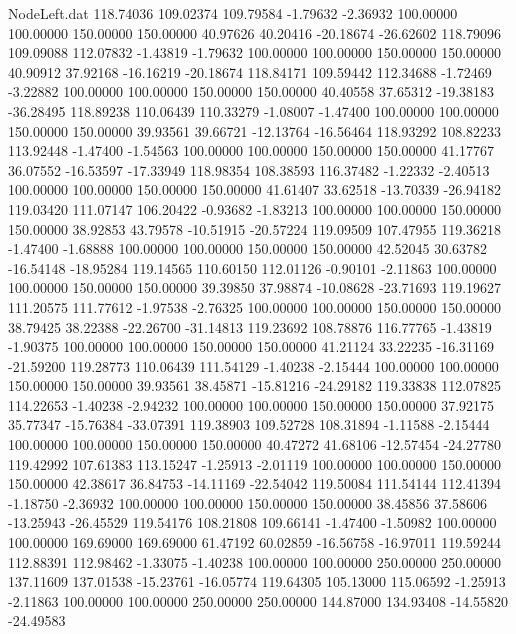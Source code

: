 \begin{filecontents}{NodeLeft.dat}
 118.74036  109.02374  109.79584    -1.79632   -2.36932  100.00000  100.00000  150.00000  150.00000   40.97626   40.20416  -20.18674  -26.62602
 118.79096  109.09088  112.07832    -1.43819   -1.79632  100.00000  100.00000  150.00000  150.00000   40.90912   37.92168  -16.16219  -20.18674
 118.84171  109.59442  112.34688    -1.72469   -3.22882  100.00000  100.00000  150.00000  150.00000   40.40558   37.65312  -19.38183  -36.28495
 118.89238  110.06439  110.33279    -1.08007   -1.47400  100.00000  100.00000  150.00000  150.00000   39.93561   39.66721  -12.13764  -16.56464
 118.93292  108.82233  113.92448    -1.47400   -1.54563  100.00000  100.00000  150.00000  150.00000   41.17767   36.07552  -16.53597  -17.33949
 118.98354  108.38593  116.37482    -1.22332   -2.40513  100.00000  100.00000  150.00000  150.00000   41.61407   33.62518  -13.70339  -26.94182
 119.03420  111.07147  106.20422    -0.93682   -1.83213  100.00000  100.00000  150.00000  150.00000   38.92853   43.79578  -10.51915  -20.57224
 119.09509  107.47955  119.36218    -1.47400   -1.68888  100.00000  100.00000  150.00000  150.00000   42.52045   30.63782  -16.54148  -18.95284
 119.14565  110.60150  112.01126    -0.90101   -2.11863  100.00000  100.00000  150.00000  150.00000   39.39850   37.98874  -10.08628  -23.71693
 119.19627  111.20575  111.77612    -1.97538   -2.76325  100.00000  100.00000  150.00000  150.00000   38.79425   38.22388  -22.26700  -31.14813
 119.23692  108.78876  116.77765    -1.43819   -1.90375  100.00000  100.00000  150.00000  150.00000   41.21124   33.22235  -16.31169  -21.59200
 119.28773  110.06439  111.54129    -1.40238   -2.15444  100.00000  100.00000  150.00000  150.00000   39.93561   38.45871  -15.81216  -24.29182
 119.33838  112.07825  114.22653    -1.40238   -2.94232  100.00000  100.00000  150.00000  150.00000   37.92175   35.77347  -15.76384  -33.07391
 119.38903  109.52728  108.31894    -1.11588   -2.15444  100.00000  100.00000  150.00000  150.00000   40.47272   41.68106  -12.57454  -24.27780
 119.42992  107.61383  113.15247    -1.25913   -2.01119  100.00000  100.00000  150.00000  150.00000   42.38617   36.84753  -14.11169  -22.54042
 119.50084  111.54144  112.41394    -1.18750   -2.36932  100.00000  100.00000  150.00000  150.00000   38.45856   37.58606  -13.25943  -26.45529
 119.54176  108.21808  109.66141    -1.47400   -1.50982  100.00000  100.00000  169.69000  169.69000   61.47192   60.02859  -16.56758  -16.97011
 119.59244  112.88391  112.98462    -1.33075   -1.40238  100.00000  100.00000  250.00000  250.00000  137.11609  137.01538  -15.23761  -16.05774
 119.64305  105.13000  115.06592    -1.25913   -2.11863  100.00000  100.00000  250.00000  250.00000  144.87000  134.93408  -14.55820  -24.49583

\end{filecontents}
